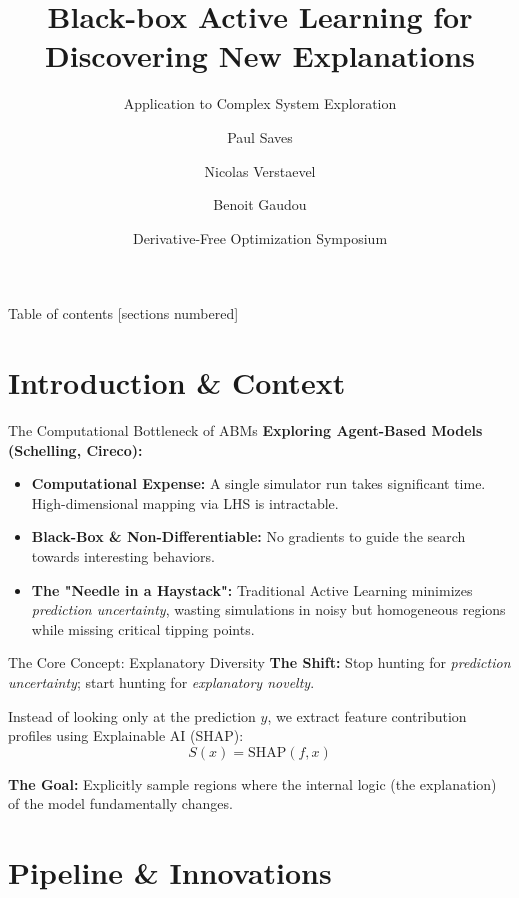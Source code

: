 \documentclass[10pt, aspectratio=169]{beamer}
\title{Black-box Active Learning for Discovering New Explanations}
\subtitle{Application to Complex System Exploration}
\date{Derivative-Free Optimization Symposium}
\author{Paul Saves \inst{1} \and Nicolas Verstaevel \inst{1} \and Benoit Gaudou \inst{1}}
\institute{\inst{1} Université Toulouse Capitole, IRIT, France}
\begin{document}
\maketitle

\begin{frame}{Table of contents}
  [sections numbered]
  \tableofcontents[hideallsubsections]
\end{frame}

\section{Introduction \& Context}

\begin{frame}[fragile]{The Computational Bottleneck of ABMs}
  \textbf{Exploring Agent-Based Models (Schelling, Cireco):}
  \begin{itemize}
    \item \textbf{Computational Expense:} A single simulator run takes significant time. High-dimensional mapping via LHS is intractable.
    \item \textbf{Black-Box \& Non-Differentiable:} No gradients to guide the search towards interesting behaviors.
    \item \textbf{The "Needle in a Haystack":} Traditional Active Learning minimizes \textit{prediction uncertainty}, wasting simulations in noisy but homogeneous regions while missing critical tipping points.
  \end{itemize}
\end{frame}

\begin{frame}[fragile]{The Core Concept: Explanatory Diversity}
  \textbf{The Shift:} Stop hunting for \textit{prediction uncertainty}; start hunting for \textit{explanatory novelty}.
  
  \vspace{0.5cm}
  Instead of looking only at the prediction $y$, we extract feature contribution profiles using Explainable AI (SHAP):
  $$S(x) = \text{SHAP}(f, x)$$
  
  \textbf{The Goal:} Explicitly sample regions where the internal logic (the explanation) of the model fundamentally changes.
\end{frame}

\section{Pipeline \& Innovations}
\end{document}
